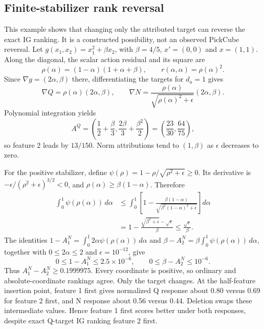 \documentclass[12pt,letterpaper]{article}
\begin{document}
\subsection{Finite-stabilizer rank reversal}
\label{sec:reversal-proof}

This example shows that changing only the attributed target can reverse the exact IG ranking. It is a constructed possibility, not an observed PickCube reversal. Let $g(x_1,x_2)=x_1^2+\beta x_2$, with $\beta=4/5$, $x'=(0,0)$ and $x=(1,1)$. Along the diagonal, the scalar action residual and its square are
\[
\rho(\alpha)=(1-\alpha)(1+\alpha+\beta),\qquad r(\alpha,\alpha)=\rho(\alpha)^2.
\]
Since $\nabla g=(2\alpha,\beta)$ there, differentiating the targets for $d_a=1$ gives
\begin{equation}
\nabla Q=\rho(\alpha)(2\alpha,\beta),\qquad
\nabla N=\frac{\rho(\alpha)}{\sqrt{\rho(\alpha)^2+\epsilon}}(2\alpha,\beta).
\end{equation}
Polynomial integration yields
\begin{equation}
A^Q=\left(\frac12+\frac\beta3,\frac{2\beta}3+\frac{\beta^2}2\right)
=\left(\frac{23}{30},\frac{64}{75}\right),
\end{equation}
so feature 2 leads by $13/150$. Norm attributions tend to $(1,\beta)$ as $\epsilon$ decreases to zero.

For the positive stabilizer, define $\psi(\rho)=1-\rho/\sqrt{\rho^2+\epsilon}\ge0$. Its derivative is $-\epsilon/(\rho^2+\epsilon)^{3/2}<0$, and $\rho(\alpha)\ge\beta(1-\alpha)$. Therefore
\begin{equation}
\begin{aligned}
\int_0^1\psi(\rho(\alpha))\,d\alpha
&\le\int_0^1\left[1-\frac{\beta(1-\alpha)}{\sqrt{\beta^2(1-\alpha)^2+\epsilon}}\right]d\alpha\\
&=1-\frac{\sqrt{\beta^2+\epsilon}-\sqrt{\epsilon}}{\beta}
\le\frac{\sqrt{\epsilon}}{\beta}.
\end{aligned}
\end{equation}
The identities $1-A_1^N=\int_0^1 2\alpha\psi(\rho(\alpha))\,d\alpha$ and $\beta-A_2^N=\beta\int_0^1\psi(\rho(\alpha))\,d\alpha$, together with $0\le2\alpha\le2$ and $\epsilon=10^{-12}$, give
\begin{equation}
0\le1-A_1^N\le2.5\times10^{-6},\qquad
0\le\beta-A_2^N\le10^{-6}.
\end{equation}
Thus $A_1^N-A_2^N\ge0.1999975$. Every coordinate is positive, so ordinary and absolute-coordinate rankings agree. Only the target changes. At the half-feature insertion point, feature 1 first gives normalized Q response about 0.80 versus 0.69 for feature 2 first, and N response about 0.56 versus 0.44. Deletion swaps these intermediate values. Hence feature 1 first scores better under both responses, despite exact Q-target IG ranking feature 2 first.
\end{document}
